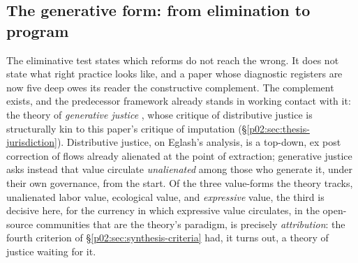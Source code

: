 \documentclass[11pt,a4paper]{article}
\newcommand{\term}[1]{\textit{\textcolor{pinkitalic}{#1}}}
\begin{document}
\subsection{The generative form: from elimination to program}
\label{p02:sec:ex-generative}

The eliminative test states which reforms do not reach the wrong. It does not state what right practice looks like, and a paper whose diagnostic registers are now five deep owes its reader the constructive complement. The complement exists, and the predecessor framework already stands in working contact with it: the theory of \term{generative justice} \parencite{eglash2016introduction}, whose critique of distributive justice is structurally kin to this paper's critique of imputation (\S\ref{p02:sec:thesis-jurisdiction}). Distributive justice, on Eglash's analysis, is a top-down, ex post correction of flows already alienated at the point of extraction; generative justice asks instead that value circulate \emph{unalienated} among those who generate it, under their own governance, from the start. Of the three value-forms the theory tracks, unalienated labor value, ecological value, and \emph{expressive} value, the third is decisive here, for the currency in which expressive value circulates, in the open-source communities that are the theory's paradigm, is precisely \emph{attribution}: the fourth criterion of \S\ref{p02:sec:synthesis-criteria} had, it turns out, a theory of justice waiting for it.
\end{document}
